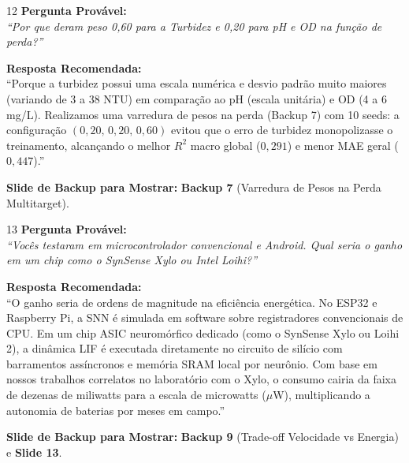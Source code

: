 \documentclass[11pt,a4paper]{article}
\begin{document}
\begin{qnabox}{12}
\textbf{Pergunta Provável:}\\
\textit{``Por que deram peso 0,60 para a Turbidez e 0,20 para pH e OD na função de perda?''}

\vspace{0.2cm}
\textbf{Resposta Recomendada:}\\
``Porque a turbidez possui uma escala numérica e desvio padrão muito maiores (variando de 3 a 38 NTU) em comparação ao pH (escala unitária) e OD (4 a 6 mg/L). Realizamos uma varredura de pesos na perda (Backup 7) com 10 seeds: a configuração $(0{,}20,\,0{,}20,\,0{,}60)$ evitou que o erro de turbidez monopolizasse o treinamento, alcançando o melhor $R^2$ macro global ($0{,}291$) e menor MAE geral ($0{,}447$).''

\vspace{0.2cm}
\textbf{Slide de Backup para Mostrar:} \textbf{Backup 7} (Varredura de Pesos na Perda Multitarget).
\end{qnabox}

\begin{qnabox}{13}
\textbf{Pergunta Provável:}\\
\textit{``Vocês testaram em microcontrolador convencional e Android. Qual seria o ganho em um chip como o SynSense Xylo ou Intel Loihi?''}

\vspace{0.2cm}
\textbf{Resposta Recomendada:}\\
``O ganho seria de ordens de magnitude na eficiência energética. No ESP32 e Raspberry Pi, a SNN é simulada em software sobre registradores convencionais de CPU. Em um chip ASIC neuromórfico dedicado (como o SynSense Xylo ou Loihi 2), a dinâmica LIF é executada diretamente no circuito de silício com barramentos assíncronos e memória SRAM local por neurônio. Com base em nossos trabalhos correlatos no laboratório com o Xylo, o consumo cairia da faixa de dezenas de miliwatts para a escala de microwatts ($\mu$W), multiplicando a autonomia de baterias por meses em campo.''

\vspace{0.2cm}
\textbf{Slide de Backup para Mostrar:} \textbf{Backup 9} (Trade-off Velocidade vs Energia) e \textbf{Slide 13}.
\end{qnabox}
\end{document}
